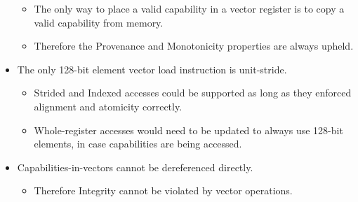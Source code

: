 \begin{itemize}
\begin{itemize}
        \item The only way to place a valid capability in a vector register is to copy a valid capability from memory.
        \item Therefore the Provenance and Monotonicity properties are always upheld.
    \end{itemize}
    \item The only 128-bit element vector load instruction is unit-stride.
    \begin{itemize}
        \item Strided and Indexed accesses could be supported as long as they enforced alignment and atomicity correctly.
        \item Whole-register accesses would need to be updated to always use 128-bit elements, in case capabilities are being accessed.
    \end{itemize}
    \item Capabilities-in-vectors cannot be dereferenced directly.
    \begin{itemize}
        \item Therefore Integrity cannot be violated by vector operations.
    \end{itemize}
\end{itemize}